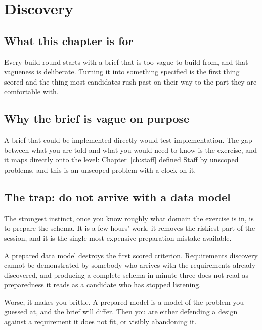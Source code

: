 \chapter{Discovery}
\label{ch:discovery}

\section*{What this chapter is for}

Every build round starts with a brief that is too vague to build from, and that
vagueness is deliberate. Turning it into something specified is the first thing
scored and the thing most candidates rush past on their way to the part they
are comfortable with.

\section{Why the brief is vague on purpose}

A brief that could be implemented directly would test implementation. The gap
between what you are told and what you would need to know is the exercise, and
it maps directly onto the level: Chapter~\ref{ch:staff} defined Staff by
unscoped problems, and this is an unscoped problem with a clock on it.


\section{The trap: do not arrive with a data model}

The strongest instinct, once you know roughly what domain the exercise is in,
is to prepare the schema. It is a few hours' work, it removes the riskiest part
of the session, and it is the single most expensive preparation mistake
available.

\begin{kittrap}
A prepared data model destroys the first scored criterion. Requirements
discovery cannot be demonstrated by somebody who arrives with the requirements
already discovered, and producing a complete schema in minute three does not
read as preparedness \dash{} it reads as a candidate who has stopped listening.

Worse, it makes you brittle. A prepared model is a model of the problem you
guessed at, and the brief will differ. Then you are either defending a design
against a requirement it does not fit, or visibly abandoning it.
\end{kittrap}

